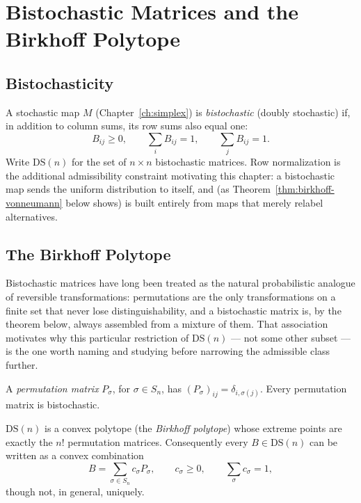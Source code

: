 \chapter{Bistochastic Matrices and the Birkhoff Polytope}
\label{ch:birkhoff}

\section{Bistochasticity}

A stochastic map $M$ (Chapter~\ref{ch:simplex}) is \emph{bistochastic} (doubly
stochastic) if, in addition to column sums, its row sums also equal one:
\begin{equation}
B_{ij} \ge 0, \qquad \sum_i B_{ij} = 1, \qquad \sum_j B_{ij} = 1.
\end{equation}
Write $\mathrm{DS}(n)$ for the set of $n \times n$ bistochastic matrices. Row
normalization is the additional admissibility constraint motivating this
chapter: a bistochastic map sends the uniform distribution to itself, and (as
Theorem~\ref{thm:birkhoff-vonneumann} below shows) is built entirely from
maps that merely relabel alternatives.

\section{The Birkhoff Polytope}

Bistochastic matrices have long been treated as the natural probabilistic
analogue of reversible transformations: permutations are the only
transformations on a finite set that never lose distinguishability, and a
bistochastic matrix is, by the theorem below, always assembled from a mixture
of them. That association motivates why this particular restriction of
$\mathrm{DS}(n)$ — not some other subset — is the one worth naming and
studying before narrowing the admissible class further.

\begin{definition}
A \emph{permutation matrix} $P_\sigma$, for $\sigma \in S_n$, has
$(P_\sigma)_{ij} = \delta_{i,\sigma(j)}$. Every permutation matrix is
bistochastic.
\end{definition}

\begin{theorem}
\label{thm:birkhoff-vonneumann}
$\mathrm{DS}(n)$ is a convex polytope (the \emph{Birkhoff polytope}) whose
extreme points are exactly the $n!$ permutation matrices. Consequently every
$B \in \mathrm{DS}(n)$ can be written as a convex combination
\begin{equation}
B = \sum_{\sigma \in S_n} c_\sigma P_\sigma, \qquad c_\sigma \ge 0, \qquad
\sum_\sigma c_\sigma = 1,
\end{equation}
though not, in general, uniquely.
\end{theorem}

